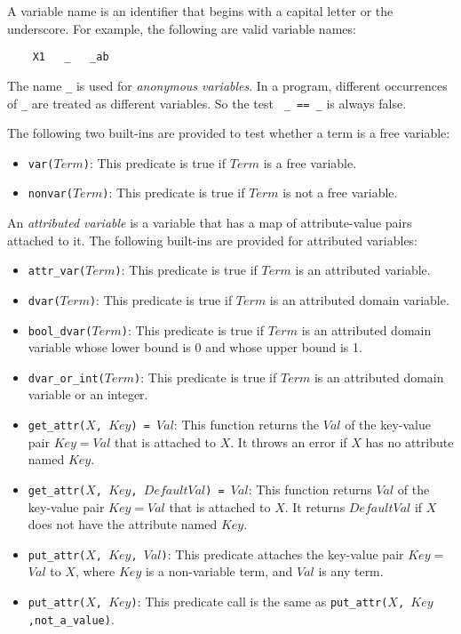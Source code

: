 A variable name is an identifier that begins with a capital letter or the underscore. For example, the following are valid variable names:
\begin{verbatim}
    X1   _   _ab
\end{verbatim}
The name \verb+_+ is used for \emph{anonymous variables}. In a program, different occurrences of \verb+_+ are treated as different variables. So the test \verb+ _ == _+ is always false.

The following two built-ins are provided to test whether a term is a free variable:
\begin{itemize}
\item \texttt{var($Term$)}: This predicate is true if $Term$ is a free variable.
\item \texttt{nonvar($Term$)}: This predicate is true if $Term$ is not a free variable.
\end{itemize}

An \emph{attributed variable} is a variable that has a map of attribute-value pairs attached to it. The following built-ins are provided for attributed variables:

\begin{itemize}
\item \texttt{attr\_var($Term$)}: This predicate is true if $Term$ is an attributed variable.
\item \texttt{dvar($Term$)}: This predicate is true if $Term$ is an attributed domain variable.
\item \texttt{bool\_dvar($Term$)}: This predicate is true if $Term$ is an attributed domain variable whose lower bound is 0 and whose upper bound is 1.
\item \texttt{dvar\_or\_int($Term$)}: This predicate is true if $Term$ is an attributed domain variable or an integer.
\item \texttt{get\_attr($X$, $Key$) = $Val$}: This function returns the \texttt{$Val$} of the key-value pair \texttt{$Key$$=$$Val$} that is attached to \texttt{$X$}. It throws an error if \texttt{$X$} has no attribute named $Key$.
\item \texttt{get\_attr($X$, $Key$, $DefaultVal$) = $Val$}: This function returns \texttt{$Val$} of the key-value pair \texttt{$Key$$=$$Val$} that is attached to \texttt{$X$}. It returns $DefaultVal$ if $X$ does not have the attribute named $Key$.
\item \texttt{put\_attr($X$, $Key$, $Val$)}: This predicate attaches the key-value pair \texttt{$Key$$=$$Val$} to \texttt{$X$}, where \texttt{$Key$} is a non-variable term, and \texttt{$Val$} is any term. 
\item \texttt{put\_attr($X$, $Key$)}: This predicate call is the same as \texttt{put\_attr($X$, $Key$,not\_a\_value)}.
\end{itemize}

